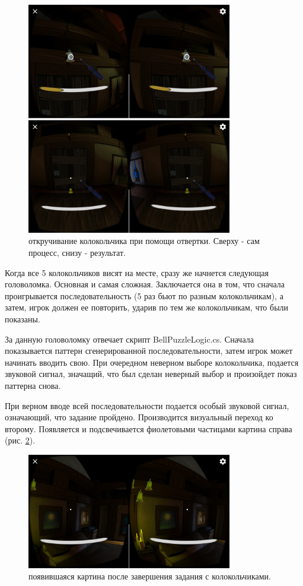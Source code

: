 \begin{figure}[h!]
    \centering
    \includegraphics[width=0.8\textwidth]{./screenshots/full_unscrew.jpg}
    \caption{\small{откручивание колокольчика при помощи отвертки. Сверху - сам процесс, снизу - результат.}}
    \label{full_unscrew}
\end{figure} 

Когда все 5 колокольчиков висят на месте, сразу же начнется следующая головоломка. Основная и самая сложная. Заключается она в том, что сначала проигрывается последовательность (5 раз бьют по разным колокольчикам), а затем, игрок должен ее повторить, ударив по тем же колокольчикам, что были показаны.

За данную головоломку отвечает скрипт BellPuzzleLogic.cs. Сначала показывается паттерн сгенерированной последовательности, затем игрок может начинать вводить свою. При очередном неверном выборе колокольчика, подается звуковой сигнал, значащий, что был сделан неверный выбор и произойдет показ паттерна снова.

При верном вводе всей последовательности подается особый звуковой сигнал, означающий, что задание пройдено. Производится визуальный переход ко второму. Появляется и подсвечивается фиолетовыми частицами картина справа (рис. \ref{pic}).

\begin{figure}[h!]
    \centering
    \includegraphics[width=0.8\textwidth]{./screenshots/pic.jpg}
    \caption{\small{появившаяся картина после завершения задания с колокольчиками.}}
    \label{pic}
\end{figure} 


